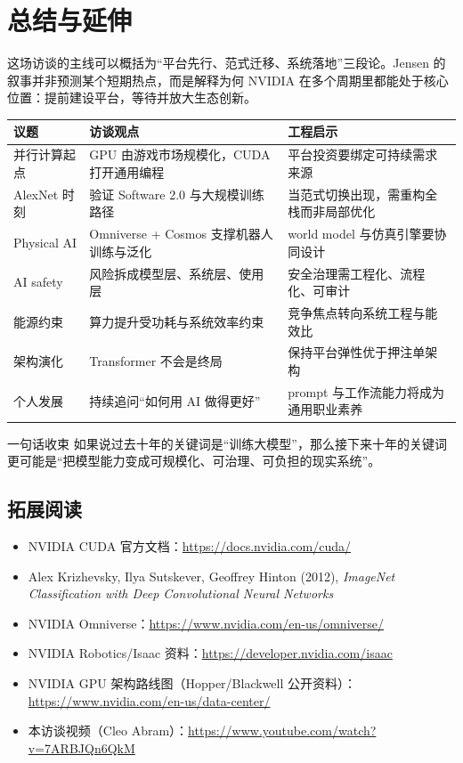 \section{总结与延伸}

这场访谈的主线可以概括为“平台先行、范式迁移、系统落地”三段论。Jensen 的叙事并非预测某个短期热点，而是解释为何 NVIDIA 在多个周期里都能处于核心位置：提前建设平台，等待并放大生态创新。

\begin{longtable}{p{} p{} p{}}
\toprule
\textbf{议题} & \textbf{访谈观点} & \textbf{工程启示} \\
\midrule
并行计算起点 & GPU 由游戏市场规模化，CUDA 打开通用编程 & 平台投资要绑定可持续需求来源 \\
\midrule
AlexNet 时刻 & 验证 Software 2.0 与大规模训练路径 & 当范式切换出现，需重构全栈而非局部优化 \\
\midrule
Physical AI & Omniverse + Cosmos 支撑机器人训练与泛化 & world model 与仿真引擎要协同设计 \\
\midrule
AI safety & 风险拆成模型层、系统层、使用层 & 安全治理需工程化、流程化、可审计 \\
\midrule
能源约束 & 算力提升受功耗与系统效率约束 & 竞争焦点转向系统工程与能效比 \\
\midrule
架构演化 & Transformer 不会是终局 & 保持平台弹性优于押注单架构 \\
\midrule
个人发展 & 持续追问“如何用 AI 做得更好” & prompt 与工作流能力将成为通用职业素养 \\
\bottomrule
\end{longtable}

\begin{importantbox}{一句话收束}
如果说过去十年的关键词是“训练大模型”，那么接下来十年的关键词更可能是“把模型能力变成可规模化、可治理、可负担的现实系统”。
\end{importantbox}

\subsection{拓展阅读}
\begin{itemize}
    \item NVIDIA CUDA 官方文档：\url{https://docs.nvidia.com/cuda/}
    \item Alex Krizhevsky, Ilya Sutskever, Geoffrey Hinton (2012), \textit{ImageNet Classification with Deep Convolutional Neural Networks}
    \item NVIDIA Omniverse：\url{https://www.nvidia.com/en-us/omniverse/}
    \item NVIDIA Robotics/Isaac 资料：\url{https://developer.nvidia.com/isaac}
    \item NVIDIA GPU 架构路线图（Hopper/Blackwell 公开资料）：\url{https://www.nvidia.com/en-us/data-center/}
    \item 本访谈视频（Cleo Abram）：\url{https://www.youtube.com/watch?v=7ARBJQn6QkM}
\end{itemize}



